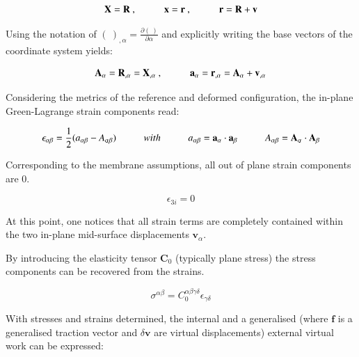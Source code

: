 \begin{equation} 
\mathbf{X} = \mathbf{R}\ ,
\hspace{10mm}
\mathbf{x} = \mathbf{r}\ ,
\hspace{10mm}
\mathbf{r} = \mathbf{R} + \mathbf{v}
\label{eqsmem1a}
\end{equation}

Using the notation of $(\ )_{,\alpha} = \frac{\partial(\ )}{\partial	\alpha}$ and explicitly writing the base vectors of the coordinate system yields:

\begin{equation} 
\mathbf{A}_\alpha  = \mathbf{R}_{,\alpha} =  \mathbf{X}_{,\alpha}
\ ,
\hspace{10mm}
\mathbf{a}_\alpha  = \mathbf{r}_{,\alpha} = \mathbf{A}_\alpha + \mathbf{v}_{,\alpha}
\label{eqsmem1b}
\end{equation}

Considering the metrics of the reference and deformed configuration, the in-plane Green-Lagrange strain components read:

\begin{equation} 
\epsilon_{\alpha\beta} = \frac{1}{2}
(a_{\alpha\beta} - A_{\alpha\beta})
\hspace{10mm}
with
\hspace{10mm}
a_{\alpha\beta} = \mathbf{a}_\alpha \cdot \mathbf{a}_\beta
\hspace{10mm}
A_{\alpha\beta} = \mathbf{A}_\alpha \cdot \mathbf{A}_\beta
\label{eqsmem2}
\end{equation}

Corresponding to the membrane assumptions, all out of plane strain components are 0.

\begin{equation} 
\epsilon_{3i} = 0
\label{eqsmem3}
\end{equation}

At this point, one notices that all strain terms are completely contained within the two in-plane mid-surface displacements $\mathbf{v}_\alpha$.

By introducing the elasticity tensor $\mathbf{C}_0$ (typically plane stress) the stress components can be recovered from the strains.

\begin{equation} 
\sigma^{\alpha\beta} = C_0^{\alpha\beta\gamma\delta} \epsilon_{\gamma\delta}
\label{eqsmem4}
\end{equation}

With stresses and strains determined, the internal and a generalised (where $\mathbf{f}$ is a generalised traction vector and $\delta \mathbf{v}$ are virtual displacements) external virtual work can be expressed:

